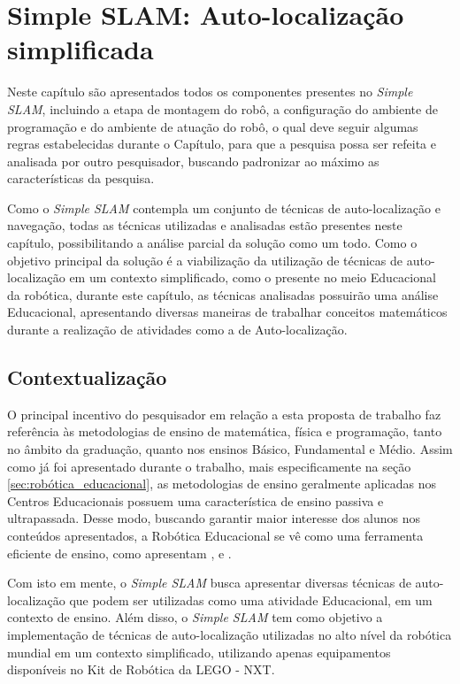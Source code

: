 \chapter[Simple SLAM]{Simple SLAM: Auto-localização simplificada}

Neste capítulo são apresentados todos os componentes presentes no \textit{Simple SLAM}, incluindo a etapa de montagem do robô, a configuração do ambiente de programação e do ambiente de atuação do robô, o qual deve seguir algumas regras estabelecidas durante o Capítulo, para que a pesquisa possa ser refeita e analisada por outro pesquisador, buscando padronizar ao máximo as características da pesquisa.

Como o \textit{Simple SLAM} contempla um conjunto de técnicas de auto-localização e navegação, todas as técnicas utilizadas e analisadas estão presentes neste capítulo, possibilitando a análise parcial da solução como um todo. Como o objetivo principal da solução é a viabilização da utilização de técnicas de auto-localização em um contexto simplificado, como o presente no meio Educacional da robótica, durante este capítulo, as técnicas analisadas possuirão uma análise Educacional, apresentando diversas maneiras de trabalhar conceitos matemáticos durante a realização de atividades como a de Auto-localização.

\section{Contextualização}

	O principal incentivo do pesquisador em relação a esta proposta de trabalho faz referência às metodologias de ensino de matemática, física e programação, tanto no âmbito da graduação, quanto nos ensinos Básico, Fundamental e Médio. Assim como já foi apresentado durante o trabalho, mais especificamente na seção \ref{sec:robótica_educacional}, as metodologias de ensino geralmente aplicadas nos Centros Educacionais possuem uma característica de ensino passiva e ultrapassada. Desse modo, buscando garantir maior interesse dos alunos nos conteúdos apresentados, a Robótica Educacional se vê como uma ferramenta eficiente de ensino, como apresentam \cite{teachingWithRoboticKit}, \cite{construcionismoPapert}e \cite{roboticaEducativaEnsinoMedio}.

	Com isto em mente, o \textit{Simple SLAM} busca apresentar diversas técnicas de auto-localização que podem ser utilizadas como uma atividade Educacional, em um contexto de ensino. Além disso, o \textit{Simple SLAM} tem como objetivo a implementação de técnicas de auto-localização utilizadas no alto nível da robótica mundial em um contexto simplificado, utilizando apenas equipamentos disponíveis no Kit de Robótica da LEGO - NXT.

